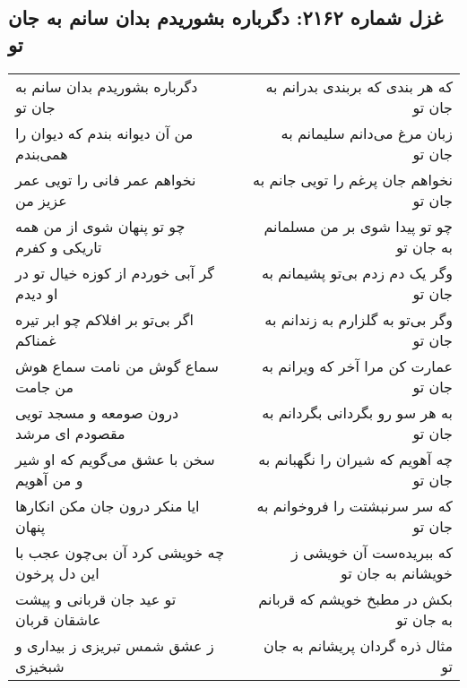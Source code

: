 \begin{center}
\section*{غزل شماره ۲۱۶۲: دگرباره بشوریدم بدان سانم به جان تو}
\label{sec:2162}
\begin{longtable}{l p{0.5cm} r}
دگرباره بشوریدم بدان سانم به جان تو
&&
که هر بندی که بربندی بدرانم به جان تو
\\
من آن دیوانه بندم که دیوان را همی‌بندم
&&
زبان مرغ می‌دانم سلیمانم به جان تو
\\
نخواهم عمر فانی را تویی عمر عزیز من
&&
نخواهم جان پرغم را تویی جانم به جان تو
\\
چو تو پنهان شوی از من همه تاریکی و کفرم
&&
چو تو پیدا شوی بر من مسلمانم به جان تو
\\
گر آبی خوردم از کوزه خیال تو در او دیدم
&&
وگر یک دم زدم بی‌تو پشیمانم به جان تو
\\
اگر بی‌تو بر افلاکم چو ابر تیره غمناکم
&&
وگر بی‌تو به گلزارم به زندانم به جان تو
\\
سماع گوش من نامت سماع هوش من جامت
&&
عمارت کن مرا آخر که ویرانم به جان تو
\\
درون صومعه و مسجد تویی مقصودم ای مرشد
&&
به هر سو رو بگردانی بگردانم به جان تو
\\
سخن با عشق می‌گویم که او شیر و من آهویم
&&
چه آهویم که شیران را نگهبانم به جان تو
\\
ایا منکر درون جان مکن انکارها پنهان
&&
که سر سرنبشتت را فروخوانم به جان تو
\\
چه خویشی کرد آن بی‌چون عجب با این دل پرخون
&&
که ببریده‌ست آن خویشی ز خویشانم به جان تو
\\
تو عید جان قربانی و پیشت عاشقان قربان
&&
بکش در مطبخ خویشم که قربانم به جان تو
\\
ز عشق شمس تبریزی ز بیداری و شبخیزی
&&
مثال ذره گردان پریشانم به جان تو
\\
\end{longtable}
\end{center}
